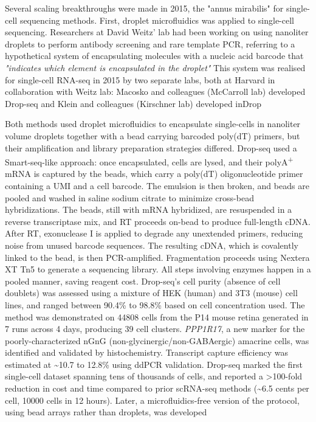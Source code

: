 Several scaling breakthroughs were made in 2015, the "annus mirabilis" for single-cell sequencing methods. First, droplet microfluidics was applied to single-cell sequencing. Researchers at David Weitz' lab had been working on using nanoliter droplets to perform antibody screening and rare template PCR, referring to a hypothetical system of encapsulating molecules with a nucleic acid barcode that \textit{"indicates which element is encapsulated in the droplet"} This system was realised for single-cell RNA-seq in 2015 by two separate labs, both at Harvard in collaboration with Weitz lab: Macosko and colleagues (McCarroll lab) developed Drop-seq and Klein and colleagues (Kirschner lab) developed inDrop

Both methods used droplet microfluidics to encapsulate single-cells in nanoliter volume droplets together with a bead carrying barcoded poly(dT) primers, but their amplification and library preparation strategies differed. Drop-seq used a Smart-seq-like approach: once encapsulated, cells are lysed, and their polyA\textsuperscript{+} mRNA is captured by the beads, which carry a poly(dT) oligonucleotide primer containing a UMI and a cell barcode. The emulsion is then broken, and beads are pooled and washed in saline sodium citrate to minimize cross-bead hybridizations. The beads, still with mRNA hybridized, are resuspended in a reverse transcriptase mix, and RT proceeds on-bead to produce full-length cDNA. After RT, exonuclease I is applied to degrade any unextended primers, reducing noise from unused barcode sequences. The resulting cDNA, which is covalently linked to the bead, is then PCR-amplified. Fragmentation proceeds using Nextera XT Tn5 to generate a sequencing library. All steps involving enzymes happen in a pooled manner, saving reagent cost. Drop-seq's cell purity (absence of cell doublets) was assessed using a mixture of HEK (human) and 3T3 (mouse) cell lines, and ranged between 90.4\% to 98.8\% based on cell concentration used. The method was demonstrated on \num{44808} cells from the P14 mouse retina generated in 7 runs across 4 days, producing 39 cell clusters. \textit{PPP1R17}, a new marker for the poorly-characterized nGnG (non-glycinergic/non-GABAergic) amacrine cells, was identified and validated by histochemistry. Transcript capture efficiency was estimated at \textasciitilde10.7 to 12.8\% using ddPCR validation. Drop-seq marked the first single-cell dataset spanning tens of thousands of cells, and reported a >100-fold reduction in cost and time compared to prior scRNA-seq methods (\textasciitilde6.5 cents per cell, \num{10000} cells in 12 hours). Later, a microfluidics-free version of the protocol, using bead arrays rather than droplets, was developed

